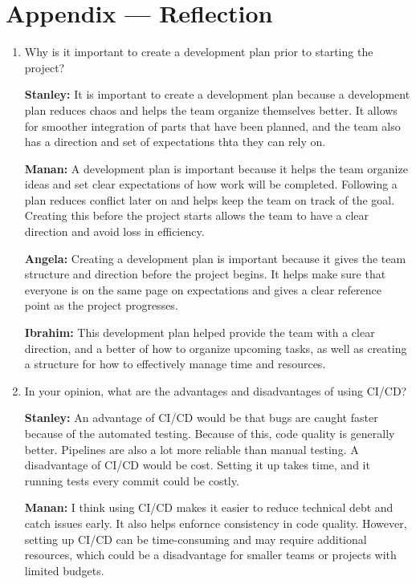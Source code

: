 \documentclass{article}
\begin{document}
\newpage{}

\section*{Appendix --- Reflection}




\begin{enumerate}
    \item Why is it important to create a development plan prior to starting the
    project?

\textbf{Stanley:} It is important to create a development plan because a development plan reduces chaos and helps the team organize themselves better. It allows for smoother integration of parts that have been planned, and the team also has a direction and set of expectations thta they can rely on. 

\textbf{Manan:} A development plan is important because it helps the team organize ideas and set clear expectations of how work will be completed. Following a plan reduces conflict later on and helps keep the team on track of the goal. Creating this before the project starts allows the team to have a clear direction and avoid loss in efficiency.

\textbf{Angela:} Creating a development plan is important because it gives the team structure and direction before the project begins. It helps make sure that everyone is on the same page on expectations and gives a clear reference point as the project progresses.

\textbf{Ibrahim:} This development plan helped provide the team with a clear direction, and a better of how to organize upcoming tasks, as well as creating a structure for how to effectively manage time and resources.

    \item In your opinion, what are the advantages and disadvantages of using
    CI/CD?

\textbf{Stanley:} An advantage of CI/CD would be that bugs are caught faster because of the automated testing. Because of this, code quality is generally better. Pipelines are also a lot more reliable than manual testing. A disadvantage of CI/CD would be cost. Setting it up takes time, and it running tests every commit could be costly.

\textbf{Manan:} I think using CI/CD makes it easier to reduce technical debt and catch issues early. It also helps enfornce consistency in code quality. However, setting up CI/CD can be time-consuming and may require additional resources, which could be a disadvantage for smaller teams or projects with limited budgets.


\end{enumerate}
\end{document}
